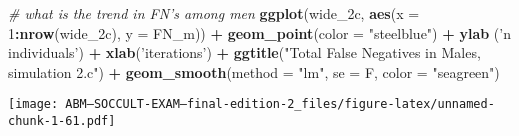 \documentclass[]{article}
\newenvironment{Shaded}{\begin{snugshade}}{\end{snugshade}}
\newcommand{\KeywordTok}[1]{\textcolor[rgb]{0.13,0.29,0.53}{\textbf{#1}}}
\newcommand{\DataTypeTok}[1]{\textcolor[rgb]{0.13,0.29,0.53}{#1}}
\newcommand{\DecValTok}[1]{\textcolor[rgb]{0.00,0.00,0.81}{#1}}
\newcommand{\StringTok}[1]{\textcolor[rgb]{0.31,0.60,0.02}{#1}}
\newcommand{\CommentTok}[1]{\textcolor[rgb]{0.56,0.35,0.01}{\textit{#1}}}
\newcommand{\OperatorTok}[1]{\textcolor[rgb]{0.81,0.36,0.00}{\textbf{#1}}}
\newcommand{\NormalTok}[1]{#1}
\begin{document}
\begin{Shaded}
\begin{Highlighting}[]
\CommentTok{# what is the trend in FN's among men}
\KeywordTok{ggplot}\NormalTok{(wide_2c, }\KeywordTok{aes}\NormalTok{(}\DataTypeTok{x =} \DecValTok{1}\OperatorTok{:}\KeywordTok{nrow}\NormalTok{(wide_2c), }\DataTypeTok{y =}\NormalTok{ FN_m)) }\OperatorTok{+}\StringTok{ }
\StringTok{  }\KeywordTok{geom_point}\NormalTok{(}\DataTypeTok{color =} \StringTok{"steelblue"}\NormalTok{) }\OperatorTok{+}
\StringTok{  }\KeywordTok{ylab}\NormalTok{ (}\StringTok{'n individuals'}\NormalTok{) }\OperatorTok{+}\StringTok{ }\KeywordTok{xlab}\NormalTok{(}\StringTok{'iterations'}\NormalTok{) }\OperatorTok{+}
\StringTok{  }\KeywordTok{ggtitle}\NormalTok{(}\StringTok{"Total False Negatives in Males, simulation 2.c"}\NormalTok{) }\OperatorTok{+}
\StringTok{  }\KeywordTok{geom_smooth}\NormalTok{(}\DataTypeTok{method =} \StringTok{"lm"}\NormalTok{, }\DataTypeTok{se =}\NormalTok{ F, }\DataTypeTok{color =} \StringTok{"seagreen"}\NormalTok{)}
\end{Highlighting}
\end{Shaded}

\texttt{[image: ABM---SOCCULT-EXAM---final-edition-2\_files/figure-latex/unnamed-chunk-1-61.pdf]}
\end{document}
